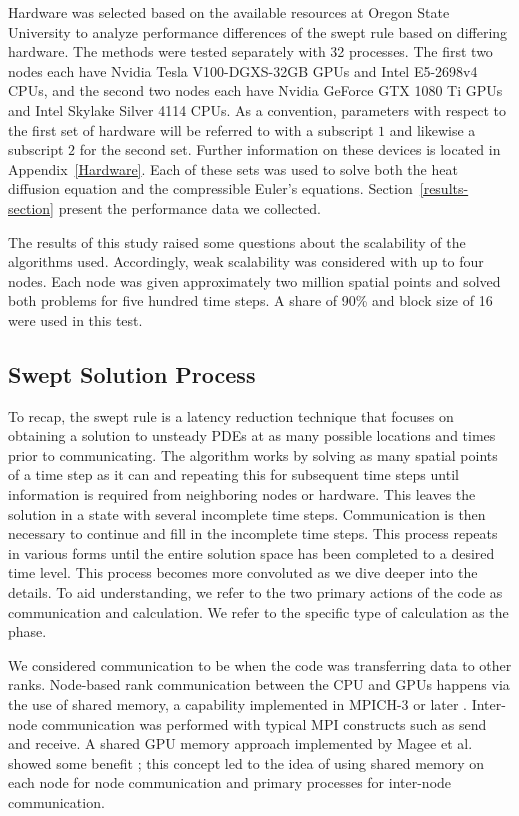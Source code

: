 \documentclass[preprints,article,accept,moreauthors,pdftex]{Definitions/mdpi}
\def\oldCPU{Intel Skylake Silver 4114} %
\def\oldGPU{Nvidia GeForce GTX 1080 Ti}
\def\newCPU{Intel E5-2698v4} %
\def\newGPU{Nvidia Tesla V100-DGXS-32GB}
\begin{document}
\par
Hardware was selected based on the available resources at Oregon State University to analyze performance differences of the swept rule based on differing hardware. The methods were tested separately with 32 processes. The first two nodes each have \newGPU{} GPUs and \newCPU{} CPUs, and the second two nodes each have \oldGPU{} GPUs and \oldCPU{} CPUs. As a convention, parameters with respect to the first set of hardware will be referred to with a subscript $1$ and likewise a subscript $2$ for the second set. Further information on these devices is located in Appendix~\ref{Hardware}. Each of these sets was used to solve both the heat diffusion equation and the compressible Euler's equations. Section~\ref{results-section} present the performance data we collected. 

\par 
The results of this study raised some questions about the scalability of the algorithms used. Accordingly, weak scalability was considered with up to four nodes. Each node was given approximately two million spatial points and solved both problems for five hundred time steps. A share of 90\% and block size of 16 were used in this test. 

\subsection{Swept Solution Process}
\label{swept-process-section}
To recap, the swept rule is a latency reduction technique that focuses on obtaining a solution to unsteady PDEs at as many possible locations and times prior to communicating. The algorithm works by solving as many spatial points of a time step as it can and repeating this for subsequent time steps until information is required from neighboring nodes or hardware. This leaves the solution in a state with several incomplete time steps. Communication is then necessary to continue and fill in the incomplete time steps. This process repeats in various forms until the entire solution space has been completed to a desired time level. This process becomes more convoluted as we dive deeper into the details. To aid understanding, we refer to the two primary actions of the code as communication and calculation. We refer to the specific type of calculation as the phase. 

\par
 We considered communication to be when the code was transferring data to other ranks. Node-based rank communication between the CPU and GPUs happens via the use of shared memory, a capability implemented in MPICH-3 or later \cite{Hoefler2013MPIMemory}. Inter-node communication was performed with typical MPI constructs such as send and receive. A shared GPU memory approach implemented by Magee et al. showed some benefit \cite{Magee2018AcceleratingDecomposition}; this concept led to the idea of using shared memory on each node for node communication and primary processes for inter-node communication.
 
\end{document}
